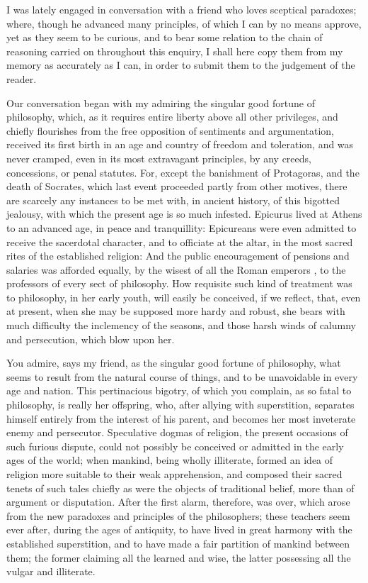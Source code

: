 \documentclass[]{article}
\begin{document}
\begin{sectionbody}

\humeparagraph  I was lately engaged in conversation with a friend who loves sceptical paradoxes; where, though he advanced many principles, of which I can by no means approve, yet as they seem to be curious, and to bear some relation to the chain of reasoning carried on throughout this enquiry, I shall here copy them from my memory as accurately as I can, in order to submit them to the judgement of the reader.

\humeparagraph  Our conversation began with my admiring the singular good fortune of philosophy, which, as it requires entire liberty above all other privileges, and chiefly flourishes from the free opposition of sentiments and argumentation, received its first birth in an age and country of freedom and toleration, and was never cramped, even in its most extravagant principles, by any creeds, concessions, or penal statutes. For, except the banishment of Protagoras, and the death of Socrates, which last event proceeded partly from other motives, there are scarcely any instances to be met with, in ancient history, of this bigotted jealousy, with which the present age is so much infested. Epicurus lived at Athens to an advanced age, in peace and tranquillity: Epicureans%
 were even admitted to receive the sacerdotal character, and to officiate at the altar, in the most sacred rites of the established religion: And the public encouragement%
 of pensions and salaries was afforded equally, by the wisest of all the Roman emperors%
, to the professors of every sect of philosophy. How requisite such kind of treatment was to philosophy, in her early youth, will easily be conceived, if we reflect, that, even at present, when she may be supposed more hardy and robust, she bears with much difficulty the inclemency of the seasons, and those harsh winds of calumny and persecution, which blow upon her.

\humeparagraph  You admire, says my friend, as the singular good fortune of philosophy, what seems to result from the natural course of things, and to be unavoidable in every age and nation. This pertinacious bigotry, of which you complain, as so fatal to philosophy, is really her offspring, who, after allying with superstition, separates himself entirely from the interest of his parent, and becomes her most inveterate enemy and persecutor. Speculative dogmas of religion, the present occasions of such furious dispute, could not possibly be conceived or admitted in the early ages of the world; when mankind, being wholly illiterate, formed an idea of religion more suitable to their weak apprehension, and composed their sacred tenets of such tales chiefly as were the objects of traditional belief, more than of argument or disputation. After the first alarm, therefore, was over, which arose from the new paradoxes and principles of the philosophers; these teachers seem ever after, during the ages of antiquity, to have lived in great harmony with the established superstition, and to have made a fair partition of mankind between them; the former claiming all the learned and wise, the latter possessing all the vulgar and illiterate.


\end{sectionbody}
\end{document}
